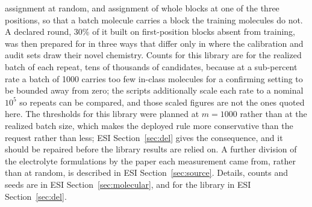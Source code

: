 \documentclass[10pt]{article}
\begin{document}
assignment at random, and assignment of whole blocks at one of the three positions, so that a batch molecule carries a block the training molecules do not. A declared round, 30\% of it built on first-position blocks absent from training, was then prepared for in three ways that differ only in where the calibration and audit sets draw their novel chemistry. Counts for this library are for the realized batch of each repeat, tens of thousands of candidates, because at a sub-percent rate a batch of 1000 carries too few in-class molecules for a confirming setting to be bounded away from zero; the scripts additionally scale each rate to a nominal $10^5$ so repeats can be compared, and those scaled figures are not the ones quoted here. The thresholds for this library were planned at $m=1000$ rather than at the realized batch size, which makes the deployed rule more conservative than the request rather than less; ESI Section~\ref{sec:del} gives the consequence, and it should be repaired before the library results are relied on. A further division of the electrolyte formulations by the paper each measurement came from, rather than at random, is described in ESI Section~\ref{sec:source}. Details, counts and seeds are in ESI Section~\ref{sec:molecular}, and for the library in ESI Section~\ref{sec:del}.

\end{document}
